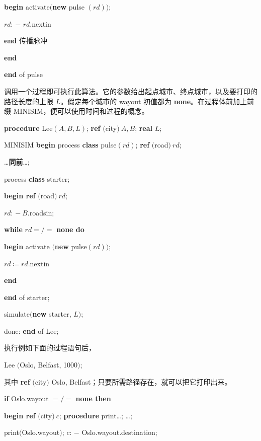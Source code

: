 \documentclass[twoside,11pt,fontset=none]{ctexbook}
\begin{document}
\quad \quad \quad \textbf{begin} activate$($\textbf{new} pulse $(rd));$

\quad \quad \quad \quad $rd$: $-$ $rd$.nextin

\quad \quad \quad \textbf{end} 传播脉冲

\quad \quad \textbf{end}

\quad \textbf{end} of pulse

调用一个过程即可执行此算法。它的参数给出起点城市、终点城市，以及要打印的路径长度的上限 $L$。假定每个城市的 wayout 初值都为 \textbf{none}。在过程体前加上前缀 MINISIM，便可以使用时间和过程的概念。

\quad \textbf{procedure} Lee$(A, B, L)$; \textbf{ref} $($city$)\ A, B$; \textbf{real} $L$;

\quad \quad MINISIM \textbf{begin} process \textbf{class} pulse$(rd)$; \textbf{ref} $($road$)\ rd$;

\quad \quad \quad \dots \textbf{同前}\dots;

\quad \quad \quad process \textbf{class} starter;

\quad \quad \quad \quad \textbf{begin ref} $($road$)\ rd$;

\quad \quad \quad \quad \quad $rd$: $-\ B$.roadsin;

\quad \quad \quad \quad \quad \textbf{while} $rd =/=$ \textbf{none do}

\quad \quad \quad \quad \quad \quad \textbf{begin} activate $($\textbf{new} pulse$(rd))$;

\quad \quad \quad \quad \quad \quad \quad \quad $rd \coloneq rd$.nextin

\quad \quad \quad \quad \quad \quad \textbf{end}

\quad \quad \quad \quad \textbf{end} of starter;

\quad \quad \quad \quad simulate$($\textbf{new} starter, $L)$;

\quad \quad done: \textbf{end} of Lee;

\noindent
执行例如下面的过程语句后，

\quad Lee $($Oslo, Belfast, 1000$)$;

\noindent
其中 \textbf{ref} $($city$)$ Oslo, Belfast；只要所需路径存在，就可以把它打印出来。

\quad \textbf{if} Oslo.wayout $=/=$ \textbf{none then}

\quad \textbf{begin ref} $($city$)\ c$; \textbf{procedure} print\dots; \dots;

\quad \quad print$($Oslo.wayout$)$; $c$: $-$ Oslo.wayout.destination;
\end{document}
